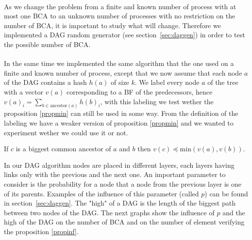 \paragraph{} As we change the problem from a finite and known number of process with at most one BCA to an unknown number of processes with no restriction on the number of BCA, it is important to study what will change. Therefore we implemented a DAG random generator (see section~\ref{sec:daggen}) in order to test the possible number of BCA. 
\paragraph{} In the same time we implemented the same algorithm that the one used on a finite and known number of process, except that we now assume that each node $a$ of the DAG contains a hash $h(a)$ of size $k$. We label every node $a$ of the tree with a vector $v(a)$ corresponding to a BF of the predecessors, hence $v(a)_i=\sum_{b\in \mathrm{ancestor}(a)} h(b)_i$, with this labeling we test wether the proposition \ref{propmin} can still be used in some way. From the definition of the labeling we have a weaker version of proposition \ref{propmin} and we wanted to experiment wether we could use it or not.
\begin{proposition}
 If $c$ is a biggest common ancestor of $a$ and $b$ then $v(c) \preccurlyeq \mathrm{min}(v(a),v(b))$. \label{propinf}
\end{proposition}
In our DAG algorithm nodes are placed in different layers, each layers having links only with the previous and the next one. An important parameter to consider is the probability for a node that a node from the previous layer is one of its parents. Examples of the influence of this parameter (called $p$) can be found in section~\ref{sec:daggen}. The "high" of a DAG is the length of the biggest path between two nodes of the DAG. The next graphs show the influence of $p$ and the high of the DAG on the number of BCA and on the number of element verifying the proposition \ref{propinf}.
